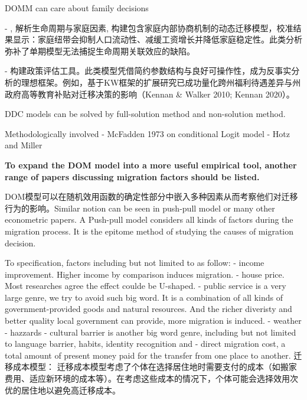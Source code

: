 \documentclass[a4paper,12pt]{article}
\begin{document}
DOMM can care about family decisions

- \cite{gemiciFamilyMigrationLabor2007}, 解析生命周期与家庭因素, 构建包含家庭内部协商机制的动态迁移模型，校准结果显示：家庭纽带会抑制人口流动性、减缓工资增长并降低家庭稳定性。此类分析弥补了单期模型无法捕捉生命周期关联效应的缺陷。







- 构建政策评估工具。此类模型凭借简约参数结构与良好可操作性，成为反事实分析的理想框架。例如，基于KW框架的扩展研究已成功量化跨州福利待遇差异与州政府高等教育补贴对迁移决策的影响（Kennan \& Walker 2010; Kennan 2020）。









DDC models can be solved by full-solution method and non-solution method.

Methodologically involved
- McFadden 1973 on conditional Logit model
- Hotz and Miller 







\textbf{To expand the DOM model into a more useful empirical tool, another range of papers discussing migration factors should be listed.}

DOM模型可以在随机效用函数的确定性部分中嵌入多种因素从而考察他们对迁移行为的影响。Similar notion can be seen in push-pull model or many other econometric papers. A Push-pull model considers all kinds of factors during the migration process. It is the epitome method of studying the causes of migration decision.

To specification, factors including but not limited to as follow:
- income improvement. Higher income by comparison induces migration. 
- house price. Most researches agree the effect coulde be U-shaped.
- public service is a very large genre, we try to avoid such big word. It is a combination of all kinds of government-provided goods and natural resources. And the richer diveristy and better quality local government can provide, more migration is induced.
- weather
- hazzards
- cultural barrier is another big word genre, including but not limited to language barrier, habits, identity recognition and 
- direct migration cost, a total amount of present money paid for the transfer from one place to another. 迁移成本模型： 迁移成本模型考虑了个体在选择居住地时需要支付的成本（如搬家费用、适应新环境的成本等）。在考虑这些成本的情况下，个体可能会选择效用次优的居住地以避免高迁移成本。
\end{document}
